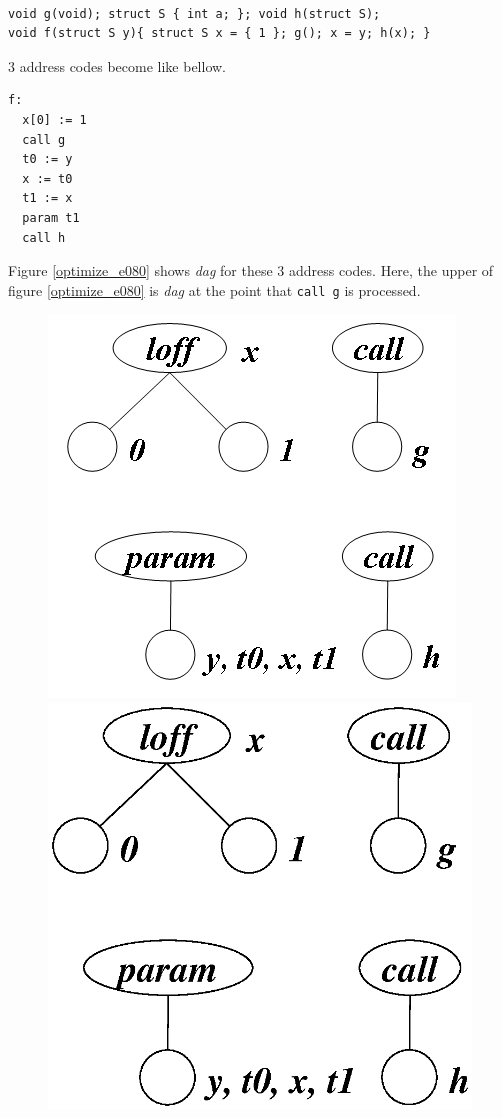\begin{Example}
\label{optimize_e079}
\begin{verbatim}

void g(void); struct S { int a; }; void h(struct S);
void f(struct S y){ struct S x = { 1 }; g(); x = y; h(x); }
\end{verbatim}
3 address codes become like bellow.
\begin{verbatim}
f:
  x[0] := 1
  call g
  t0 := y
  x := t0
  t1 := x
  param t1
  call h
\end{verbatim}
Figure \ref{optimize_e080} shows {\em dag} for these 3 address codes.
Here, the upper of figure \ref{optimize_e080} is {\em dag}
at the point that {\tt{call g}} is processed.
\begin{figure}[htbp]
\begin{center}
\begin{htmlonly}
\includegraphics[width=0.6\linewidth,height=0.6\linewidth]{opt033.png}
\end{htmlonly}
\begin{latexonly}
\includegraphics[width=0.6\linewidth,height=0.6\linewidth]{opt033.eps}

\end{latexonly}
\end{center}
\end{figure}
\end{Example}
